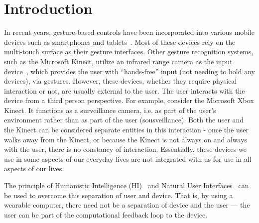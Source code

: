 \section{Introduction}
In recent years, gesture-based controls have been incorporated into various
mobile devices such as smartphones and tablets~\cite{ording2010portable,miyaki2009graspzoom,tsukadaa2001ubi,bbgeestures}. 
Most of these devices rely on the multi-touch surface as their gesture interfaces. Other
gesture recognition systems, such as the Microsoft Kinect, utilize an
infrared range camera as the input device~\cite{msprimesense2010press},
which provides the user with ``hands-free'' input (not needing to hold any
devices), via gestures. However, these devices, whether they require physical
interaction or not, are usually external to the user. The user interacts
with the device from a third person perspective. For example, consider
the Microsoft Xbox Kinect. It functions as a
surveillance camera, i.e. as part of the user's environment
rather than as part of the user (sousveillance). Both the user and
the Kinect can be considered separate entities in
this interaction - once the user walks away from the Kinect, or because
the Kinect is not always on and always with the user,
there is no constancy of interaction.
Essentially, these devices we use in some aspects of our everyday lives
are not integrated with us for use in all aspects of our lives.

The principle of Humanistic Intelligence (HI)~\cite{mann2001wearable}
and Natural User Interfaces~\cite{mann2001intelligent}
can be used to overcome this separation of user and device. That is,
by using a wearable computer, there need not be a separation of device and
the user --- the user can be part of the computational
feedback loop to the device.

